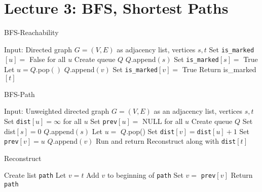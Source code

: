 \documentclass[10pt]{article}
\begin{document}
\break
\section{Lecture 3: BFS, Shortest Paths}

\begin{algorithm}
\caption{BFS-Reachability}
\label{alg:bfs-reach}
\begin{algorithmic}[1]
  \STATE Input: Directed graph $G = (V,E)$ as adjacency list, vertices $s,t$
  \STATE Set \texttt{is\_marked}$[u] = $ False for all $u$
  \STATE Create queue $Q$
  \STATE $Q$.append$(s)$
  \STATE Set \texttt{is\_marked}$[s] = $ True
    \STATE Let $u = Q$.pop$()$
      \STATE $Q$.append$(v)$
      \STATE Set \texttt{is\_marked}$[v] = $ True
    \ENDFOR
  \ENDWHILE
  \STATE Return is\_marked$[t]$
\end{algorithmic}
\end{algorithm}


\begin{algorithm}
\caption{BFS-Path}
\begin{algorithmic}[1]
  \STATE Input: Unweighted directed graph $G = (V,E)$ as an adjacency list, vertices $s,t$
  \STATE Set \texttt{dist}$[u] = \infty$ for all $u$
  \STATE Set \texttt{prev}$[u] = $ NULL for all $u$
  \STATE Create queue $Q$
  \STATE Set dist$[s] = 0$
  \STATE $Q$.append$(s)$
    \STATE Let $u = $ $Q$.pop()
        \STATE Set \texttt{dist}$[v] = $\texttt{dist}$[u] + 1$
        \STATE Set \texttt{prev}$[v] = u$
        \STATE $Q$.append$(v)$
      \ENDIF
    \ENDFOR
  \ENDWHILE
  \STATE Run and return Reconstruct along with \texttt{dist}$[t]$
\end{algorithmic}
\end{algorithm}

\begin{algorithm}
\caption{Reconstruct}
\begin{algorithmic}[1]
  \STATE Create list \texttt{path}
  \STATE Let $v = t$
    \STATE Add $v$ to beginning of \texttt{path}
    \STATE Set $v = $ \texttt{prev}$[v]$
  \ENDWHILE
  \STATE Return \texttt{path}
\end{algorithmic}
\end{algorithm}
\end{document}

